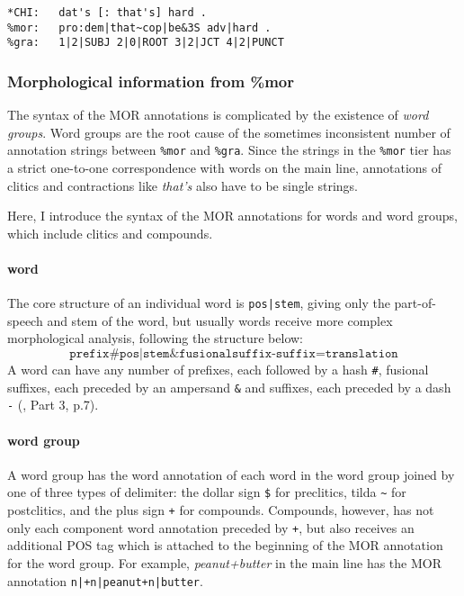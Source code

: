 \lstset{
numbers = none,
frame = single,
}

\begin{lstlisting}[caption={Example to show the different number of strings in \texttt{\%mor} and \texttt{\&gra} tiers due to contracted form \emph{that's}.}, label={lst:chatsent3}]
*CHI:   dat's [: that's] hard .
%mor:   pro:dem|that~cop|be&3S adv|hard .
%gra:   1|2|SUBJ 2|0|ROOT 3|2|JCT 4|2|PUNCT
\end{lstlisting}

\subsubsection{Morphological information from \%mor}

The syntax of the MOR annotations is complicated by the existence of \emph{word groups}. Word groups are the root cause of the sometimes inconsistent number of annotation strings between \texttt{\%mor} and \texttt{\%gra}. Since the strings in the \texttt{\%mor} tier has a strict one-to-one correspondence with words on the main line, annotations of clitics and contractions like \emph{that's} also have to be single strings.

Here, I introduce the syntax of the MOR annotations for words and word groups, which include clitics and compounds.

\paragraph{word}
The core structure of an individual word is \texttt{pos|stem}, giving only the part-of-speech and stem of the word, but usually words receive more complex morphological analysis, following the structure below:
$$\texttt{prefix\#pos|stem\&fusionalsuffix-suffix=translation}$$
A word can have any number of prefixes, each followed by a hash \texttt{\#}, fusional suffixes, each preceded by an ampersand \texttt{\&} and suffixes, each preceded by a dash \texttt{-} (\cite{Macwhinney2000}, Part 3, p.7).

\paragraph{word group}
A word group has the word annotation of each word in the word group joined by one of three types of delimiter: the dollar sign \texttt{\$} for preclitics, tilda \texttt{\~{}} for postclitics, and the plus sign \texttt{+} for compounds. Compounds, however, has not only each component word annotation preceded by \texttt{+}, but also receives an additional POS tag which is attached to the beginning of the MOR annotation for the word group. For example, \emph{peanut+butter} in the main line has the MOR annotation \texttt{n|+n|peanut+n|butter}.

